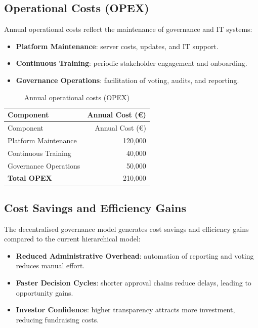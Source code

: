 \documentclass[
  english,
  12pt,
  oneside,
  open=any]{scrbook}
\providecommand{\tightlist}{%
  \setlength{\itemsep}{0pt}\setlength{\parskip}{0pt}}\usepackage{longtable,booktabs,array}
\begin{document}
\subsection{Operational Costs (OPEX)}\label{sec-opex}

Annual operational costs reflect the maintenance of governance and IT
systems:

\begin{itemize}
\tightlist
\item
  \textbf{Platform Maintenance}: server costs, updates, and IT
  support.\\
\item
  \textbf{Continuous Training}: periodic stakeholder engagement and
  onboarding.\\
\item
  \textbf{Governance Operations}: facilitation of voting, audits, and
  reporting.
\end{itemize}

\begin{longtable}[]{@{}lr@{}}
\caption{Annual operational costs (OPEX)}\label{tbl-opex}\tabularnewline
\toprule\noalign{}
Component & Annual Cost (€) \\
\midrule\noalign{}
\endfirsthead
\toprule\noalign{}
Component & Annual Cost (€) \\
\midrule\noalign{}
\endhead
\bottomrule\noalign{}
\endlastfoot
Platform Maintenance & 120,000 \\
Continuous Training & 40,000 \\
Governance Operations & 50,000 \\
\textbf{Total OPEX} & 210,000 \\
\end{longtable}

\subsection{Cost Savings and Efficiency Gains}\label{sec-savings}

The decentralised governance model generates cost savings and efficiency
gains compared to the current hierarchical model:

\begin{itemize}
\tightlist
\item
  \textbf{Reduced Administrative Overhead}: automation of reporting and
  voting reduces manual effort.\\
\item
  \textbf{Faster Decision Cycles}: shorter approval chains reduce
  delays, leading to opportunity gains.\\
\item
  \textbf{Investor Confidence}: higher transparency attracts more
  investment, reducing fundraising costs.
\end{itemize}
\end{document}
